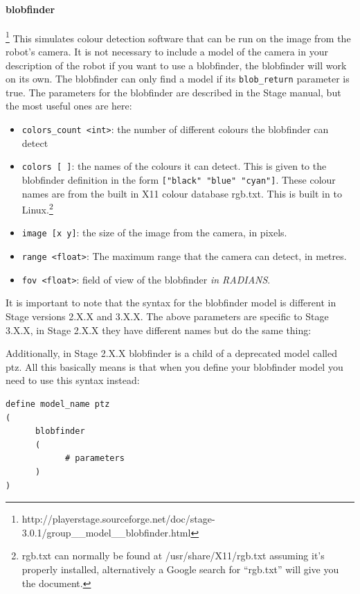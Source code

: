 \documentclass[a4paper]{report}
\begin{document}
\paragraph{blobfinder}\footnote{http://playerstage.sourceforge.net/doc/stage-3.0.1/group\_\_model\_\_blobfinder.html}
This simulates colour detection software that can be run on the image from the robot's camera. It is not necessary to include a model of the camera in your description of the robot if you want to use a blobfinder, the blobfinder will work on its own. The blobfinder can only find a model if its \verb|blob_return| parameter is true. The parameters for the blobfinder are described in the Stage manual, but the most useful ones are here:
\begin{itemize}
\item \verb|colors_count <int>|: the number of different colours the blobfinder can detect
\item \verb|colors [ ]|: the names of the colours it can detect. This is given to the blobfinder definition in the form \verb|["black" "blue" "cyan"]|. These colour names are from the built in X11 colour database rgb.txt. This is built in to Linux.\footnote{rgb.txt can normally be found at /usr/share/X11/rgb.txt assuming it's properly installed, alternatively a Google search for ``rgb.txt'' will give you the document.}
\item \verb|image [x y]|: the size of the image from the camera, in pixels.
\item \verb|range <float>|: The maximum range that the camera can detect, in metres.
\item \verb|fov <float>|: field of view of the blobfinder \emph{in RADIANS}.
\end{itemize}
It is important to note that the syntax for the blobfinder model is different in Stage versions 2.X.X and 3.X.X. The above parameters are specific to Stage 3.X.X, in Stage 2.X.X they have different names but do the same thing:
Additionally, in Stage 2.X.X blobfinder is a child of a deprecated model called ptz. All this basically means is that when you define your blobfinder model you need to use this syntax instead:
\begin{verbatim}
define model_name ptz
(
      blobfinder
      (
            # parameters
      )
)
\end{verbatim}
\end{document}
